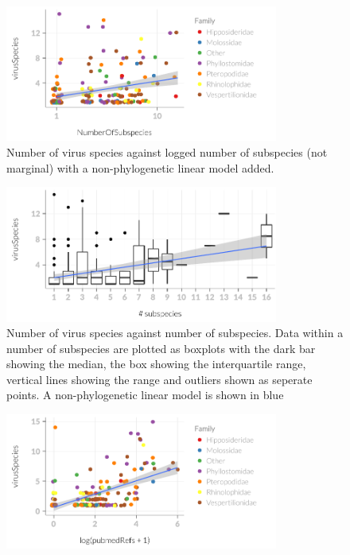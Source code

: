 \begin{knitrout}
\begin{figure}[t]

{\centering \includegraphics[width=0.8\textwidth]{figure/subsDataviz-3} 

}

\caption[Number of virus species against logged number of subspecies (not marginal) with a non-phylogenetic linear model added]{Number of virus species against logged number of subspecies (not marginal) with a non-phylogenetic linear model added.}\label{fig:subsDataviz}
\end{figure}

\begin{figure}[t]

{\centering \includegraphics[width=0.8\textwidth]{figure/subsDataviz-4} 

}

\caption[Number of virus species against number of subspecies]{Number of virus species against number of subspecies. Data within a number of subspecies are plotted as boxplots with the dark bar showing the median, the box showing the interquartile range, vertical lines showing the range and outliers shown as seperate points. A non-phylogenetic linear model is shown in blue}\label{fig:subsDataviz}
\end{figure}

\begin{figure}[t]

{\centering \includegraphics[width=0.8\textwidth]{figure/subsDataviz-5} 

}
\end{figure}
\end{knitrout}
